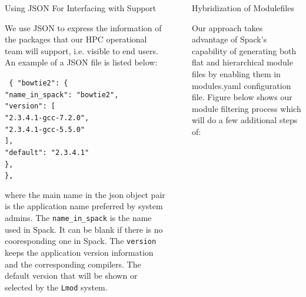 \documentclass[final]{beamer}
\newlength{\sepwid}
\newlength{\onecolwid}
\begin{document}
\begin{frame}[t]
\begin{columns}[t]
\begin{column}{\onecolwid}
\vspace{-1em}
\begin{block}{Using JSON For Interfacing with Support}

We use JSON to express the information of the packages that our HPC operational team will support, i.e. visible to end users. An example of a JSON file is listed below:

\texttt{
\{  "bowtie2": \{ \\
\qquad \qquad         "name\_in\_spack": "bowtie2", \\
\qquad \qquad         "version": [ \\
\qquad \qquad \qquad             "2.3.4.1-gcc-7.2.0",\\
\qquad \qquad \qquad             "2.3.4.1-gcc-5.5.0" \\
\qquad \qquad         ], \\
\qquad \qquad         "default": "2.3.4.1" \\
\qquad     \}, \\
\}, \\
}

where the main name in the json object pair is the application name preferred by system admins. The \texttt{name\_in\_spack} is the name used in Spack. It can be blank if there is no cooresponding one in Spack. The \texttt{version} keeps the application version information and the corresponding compilers. The default version that will be shown or selected by the \texttt{Lmod} system.

\end{block}

\end{column} %


\begin{column}{\sepwid}\end{column} %

\begin{column}{\onecolwid} %


\begin{block}{Hybridization of Modulefiles}

Our approach takes advantage of Spack's capability of generating both flat and hierarchical module files by enabling them in modules.yaml configuration file. Figure below shows our module filtering process which will do a few additional steps of:


\end{block}
\end{column}
\end{columns}
\end{frame}
\end{document}
